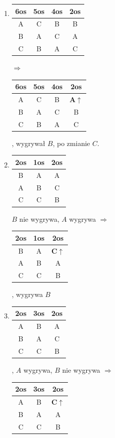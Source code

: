 \documentclass[12pt,a4paper]{article}
\theoremstyle{break}
\begin{document}
\begin{enumerate}[K1)]
			\item \begin{tabular}{|c|c|c|c|}\hline
				6os & 5os & 4os & 2os\\\hline
				A & C & B & B\\\hline
				B & A & C & A\\\hline
				C & B & A & C\\\hline
			\end{tabular} $\Rightarrow$ \begin{tabular}{|c|c|c|c|}\hline
				6os & 5os & 4os & 2os\\\hline
				A & C & B & \textbf{A$\uparrow$}\\\hline
				B & A & C & B\\\hline
				C & B & A & C\\\hline
			\end{tabular}, wygrywał $B$, po zmianie $C$.
			
			\item \begin{tabular}{|c|c|c|}\hline
				2os & 1os & 2os\\\hline
				B & A & A\\\hline
				A & B & C\\\hline
				C & C & B\\\hline
			\end{tabular} $B$ nie wygrywa, $A$ wygrywa $\Rightarrow$\begin{tabular}{|c|c|c|}\hline
				2os & 1os & 2os\\\hline
				B & A & \textbf{C$\uparrow$}\\\hline
				A & B & A\\\hline
				C & C & B\\\hline
			\end{tabular}, wygrywa $B$
			
			\item \begin{tabular}{|c|c|c|}\hline
				2os & 3os & 2os\\\hline
				A & B & A\\\hline
				B & A & C\\\hline
				C & C & B\\\hline
			\end{tabular}, $A$ wygrywa, $B$ nie wygrywa $\Rightarrow$ \begin{tabular}{|c|c|c|}\hline
				2os & 3os & 2os\\\hline
				A & B & \textbf{C$\uparrow$}\\\hline
				B & A & A\\\hline
				C & C & B\\\hline
			\end{tabular}
			

\end{enumerate}
\end{document}
